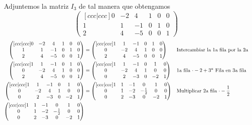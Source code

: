 \documentclass[letterpaper]{article}
\renewcommand{\*}{\cdot}
\theoremstyle{definition}
\begin{document}
	Adjuntemos la matriz $ I_3 $ de tal manera que obtengamos
	\[\begin{pmatrix}[ccc|ccc]
	0 & -2 & 4 & 1 & 0 & 0\\
	1 & 1 & -1 & 0 & 1 & 0\\
	2 & 4 & -5 & 0 & 0 & 1
	\end{pmatrix}\]
	\begin{align*}
		\begin{pmatrix}[ccc|ccc]
		0 & -2 & 4 & 1 & 0 & 0\\
		1 & 1 & -1 & 0 & 1 & 0\\
		2 & 4 & -5 & 0 & 0 & 1
		\end{pmatrix} & = \begin{pmatrix}[ccc|ccc]
		1 & 1 & -1 & 0 & 1 & 0\\
		0 & -2 & 4 & 1 & 0 & 0\\
		2 & 4 & -5 & 0 & 0 & 1
		\end{pmatrix} && \text{Intercambiar la 1a fila por la 2a}\\
		\begin{pmatrix}[ccc|ccc]
		1 & 1 & -1 & 0 & 1 & 0\\
		0 & -2 & 4 & 1 & 0 & 0\\
		2 & 4 & -5 & 0 & 0 & 1
		\end{pmatrix} & = \begin{pmatrix}[ccc|ccc]
		1 & 1 & -1 & 0 & 1 & 0\\
		0 & -2 & 4 & 1 & 0 & 0\\
		0 & 2 & -3 & 0 & -2 & 1
		\end{pmatrix} && \text{1a fila $ \* -2  + 3^a$ Fila en 3a fila}\\
		\begin{pmatrix}[ccc|ccc]
		1 & 1 & -1 & 0 & 1 & 0\\
		0 & -2 & 4 & 1 & 0 & 0\\
		0 & 2 & -3 & 0 & -2 & 1
		\end{pmatrix} &= \begin{pmatrix}[ccc|ccc]
		1 & 1 & -1 & 0 & 1 & 0\\
		0 & 1 & -2 & -\frac{1}{2} & 0 & 0\\
		0 & 2 & -3 & 0 & -2 & 1
		\end{pmatrix} && \text{Multiplicar 2a fila $ \* -\dfrac{1}{2} $}\\
		\begin{pmatrix}[ccc|ccc]
		1 & 1 & -1 & 0 & 1 & 0\\
		0 & 1 & -2 & -\frac{1}{2} & 0 & 0\\
		0 & 2 & -3 & 0 & -2 & 1

\end{pmatrix}
\end{align*}
\end{document}
